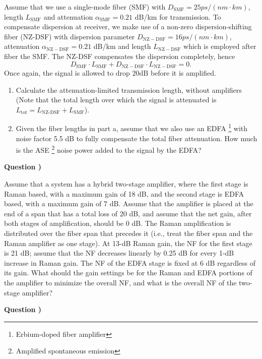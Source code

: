 \documentclass[10pt,letterpaper]{article}
\newcounter{questionnumber}
\newcommand{\Q}{
\textbf{Question \thequestionnumber)}
\stepcounter{questionnumber}
}
\begin{document}
Assume that we use a single-mode fiber (SMF) with $D_\mathrm{SMF}=25 ps/(nm\cdot km)$, length $L_\mathrm{SMF}$ and attenuation $\alpha_\mathrm{SMF}=0.21$ dB/km for transmission. To compensate dispersion at receiver, we make use of a non-zero dispersion-shifting fiber (NZ-DSF) with dispersion parameter $D_\mathrm{NZ-DSF}=16 ps/(nm\cdot km)$, attenuation $\alpha_\mathrm{NZ-DSF}=0.21$ dB/km and length $L_\mathrm{NZ-DSF}$ which is employed after fiber the SMF. The NZ-DSF compensates the dispersion completely, hence 
$$
D_\mathrm{SMF}\cdot L_\mathrm{SMF}+D_\mathrm{NZ-DSF}\cdot L_\mathrm{NZ-DSF}=0.
$$
Once again, the signal is allowed to drop $20\text{dB}$ before it is amplified.
\begin{enumerate}[label=\alph*.]
\item
Calculate the attenuation-limited transmission length, without amplifiers (Note that the total length over which the signal is attenuated is $L_\text{tot}=L_\text{NZ-DSF}+L_\text{SMF}$).
\item
Given the fiber lengths in part a, assume that we also use an EDFA
\footnote{
Erbium-doped fiber amplifier
}
with noise factor 5.5 dB to fully compensate the total fiber attenuation. How much is the ASE
\footnote{
Amplified spontaneous emission
}
 noise power added to the signal by the EDFA?
\end{enumerate}

\Q

Assume that a system has a hybrid two-stage amplifier, where the first stage is
Raman based, with a maximum gain of 18 dB, and the second stage is EDFA
based, with a maximum gain of 7 dB. Assume that the amplifier is placed at
the end of a span that has a total loss of 20 dB, and assume that the net gain,
after both stages of amplification, should be 0 dB. The Raman amplification
is distributed over the fiber span that precedes it (i.e., treat the fiber span and
the Raman amplifier as one stage). At 13-dB Raman gain, the NF for the first
stage is 21 dB; assume that the NF decreases linearly by 0.25 dB for every
1-dB increase in Raman gain. The NF of the EDFA stage is fixed at 6 dB regardless
of its gain. What should the gain settings be for the Raman and EDFA
portions of the amplifier to minimize the overall NF, and what is the overall
NF of the two-stage amplifier?

\Q
\end{document}
